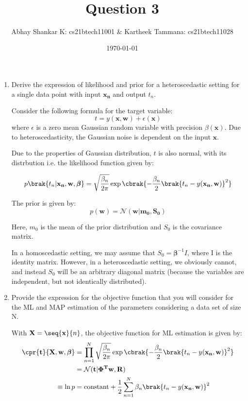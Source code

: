 \documentclass{amsart}
\begin{document}
    \title{Question 3}
    \author{Abhay Shankar K: cs21btech11001 \& Kartheek Tammana: cs21btech11028}
    \date{\today}
    \maketitle

    \begin{enumerate}[label=\textbf{(\Roman*)}]
        \item Derive the expression of likelihood and prior for a heteroscedastic setting for a single data point with input \(\mathbf{x_n}\) and output \(t_n\).
        
        Consider the following formula for the target variable:
        \[t = y(\mathbf{x, w}) + \epsilon(\mathbf{x})\] where \(\epsilon\) is a zero mean Gaussian random variable with precision \(\beta(\mathbf{x})\). 
        Due to heteroscedasticity, the Gaussian noise is dependent on the input \(\mathbf{x}\). 
        
        Due to the properties of Gaussian distribution, \(t\) is also normal, with its distrbution i.e. the likelihood function given by:

        \[p\brak{t_n | \mathbf{x_n}, \mathbf{w}, \boldsymbol{\beta}} = \sqrt{\frac{\beta_n}{2\pi}} \exp \cbrak{- \frac{\beta_n}{2} \brak{t_n - y( \mathbf{x_n, w})}^2}\]


        The prior is given by:
        \[p(\mathbf{w}) = \mathcal{N}(\mathbf{w} | \mathbf{m_0}, \mathbf{S_0})\]

        Here, \(m_0\) is the mean of the prior distribution and \(S_0\) is the covariance matrix.

        In a homoscedastic setting, we may assume that \(S_0 = \mathbf{\beta}^{-1} I\), where I is the identity matrix. However, in a heteroscedastic setting, we obviously cannot, and instead \(S_0\) will be an arbitrary diagonal matrix (because the variables are independent, but not identically distributed).

        \item Provide the expression for the objective function that you will consider for the ML and MAP estimation of the parameters considering a data set of size N.
        
        With \(\mathbf{X} = \seq{\mathbf{x}}{n}\), the objective function for ML estimation is given by:
        \begin{align}
            \cpr{\mathbf{t}}{\mathbf{X}, \mathbf{w}, \boldsymbol{\beta}} &= \prod_{n = 1}^{N} \sqrt{\frac{\beta_n}{2\pi}} \exp \cbrak{- \frac{\beta_n}{2} \brak{t_n - y(\mathbf{x_n, w})}^2} \\
            &= \mathcal{N} (\mathbf{t}|\mathbf{\Phi^Tw, R})\\
            \equiv \ln p &= \text{constant} + \frac{1}{2} \sum_{n = 1}^{N} \beta_n \brak{t_n - y(\mathbf{x_n, w})}^2 \label{eq:ml}
        \end{align}


\end{enumerate}
\end{document}
